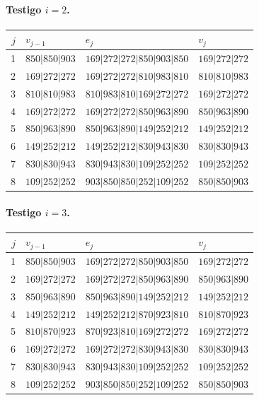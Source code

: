 \paragraph{Testigo \(i=2\).}
\begin{center}
\small
\begin{tabular}{rlll}
\hline
\(j\)&\(v_{j-1}\)&\(e_j\)&\(v_j\)\\
\hline
1&\(850|850|903\)&\(169|272|272|850|903|850\)&\(169|272|272\)\\
2&\(169|272|272\)&\(169|272|272|810|983|810\)&\(810|810|983\)\\
3&\(810|810|983\)&\(810|983|810|169|272|272\)&\(169|272|272\)\\
4&\(169|272|272\)&\(169|272|272|850|963|890\)&\(850|963|890\)\\
5&\(850|963|890\)&\(850|963|890|149|252|212\)&\(149|252|212\)\\
6&\(149|252|212\)&\(149|252|212|830|943|830\)&\(830|830|943\)\\
7&\(830|830|943\)&\(830|943|830|109|252|252\)&\(109|252|252\)\\
8&\(109|252|252\)&\(903|850|850|252|109|252\)&\(850|850|903\)\\
\hline
\end{tabular}
\end{center}

\paragraph{Testigo \(i=3\).}
\begin{center}
\small
\begin{tabular}{rlll}
\hline
\(j\)&\(v_{j-1}\)&\(e_j\)&\(v_j\)\\
\hline
1&\(850|850|903\)&\(169|272|272|850|903|850\)&\(169|272|272\)\\
2&\(169|272|272\)&\(169|272|272|850|963|890\)&\(850|963|890\)\\
3&\(850|963|890\)&\(850|963|890|149|252|212\)&\(149|252|212\)\\
4&\(149|252|212\)&\(149|252|212|870|923|810\)&\(810|870|923\)\\
5&\(810|870|923\)&\(870|923|810|169|272|272\)&\(169|272|272\)\\
6&\(169|272|272\)&\(169|272|272|830|943|830\)&\(830|830|943\)\\
7&\(830|830|943\)&\(830|943|830|109|252|252\)&\(109|252|252\)\\
8&\(109|252|252\)&\(903|850|850|252|109|252\)&\(850|850|903\)\\
\hline
\end{tabular}
\end{center}

